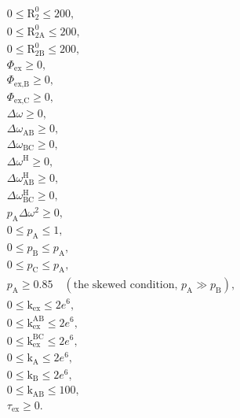 \documentclass[a4paper,11pt,twoside,openright]{book}
\def\lthtmlcheckvsize{\ifdim\ht\sizebox<\vsize 
  \ifdim\wd\sizebox<\hsize\expandafter\hfill\fi \expandafter\vfill
  \else\expandafter\vss\fi}%
\begin{document}
{\newpage\clearpage
\setcounter{equation}{96}
%
\begin{subequations}\begin{gather}
0 \leqslant \mathrm{R}_2^0\leqslant 200, \\
0 \leqslant \mathrm{R}_{\mathrm{2A}}^0\leqslant 200, \\
0 \leqslant \mathrm{R}_{\mathrm{2B}}^0\leqslant 200, \\
\Phi_{\textrm{ex}}\geqslant 0, \\
\Phi_{\textrm{ex,B}}\geqslant 0, \\
\Phi_{\textrm{ex,C}}\geqslant 0, \\
\Delta\omega \geqslant 0, \\
\Delta\omega_{\textrm{AB}}\geqslant 0, \\
\Delta\omega_{\textrm{BC}}\geqslant 0, \\
\Delta\omega^{\scriptscriptstyle\mathrm{H}}\geqslant 0, \\
\Delta\omega^{\scriptscriptstyle\mathrm{H}}_{\textrm{AB}}\geqslant 0, \\
\Delta\omega^{\scriptscriptstyle\mathrm{H}}_{\textrm{BC}}\geqslant 0, \\
p_{\textrm{A}}\Delta\omega ^2 \geqslant 0, \\
0 \leqslant p_{\textrm{A}}\leqslant 1, \\
0 \leqslant p_{\textrm{B}}\leqslant p_{\textrm{A}}, \\
0 \leqslant p_{\textrm{C}}\leqslant p_{\textrm{A}}, \\
p_{\textrm{A}}\geqslant 0.85 \quad (\textrm{the skewed condition, } p_{\textrm{A}}\gg p_{\textrm{B}}), \\
0 \leqslant \textrm{k}_{\textrm{ex}}\leqslant 2e^6, \\
0 \leqslant \textrm{k}_{\textrm{ex}}^{\textrm{AB}}\leqslant 2e^6, \\
0 \leqslant \textrm{k}_{\textrm{ex}}^{\textrm{BC}}\leqslant 2e^6, \\
0 \leqslant \textrm{k}_{\textrm{A}}\leqslant 2e^6, \\
0 \leqslant \textrm{k}_{\textrm{B}}\leqslant 2e^6, \\
0 \leqslant \textrm{k}_{\textrm{AB}}\leqslant 100, \\
\tau_{\textrm{ex}}\geqslant 0.
\end{gather}\end{subequations}%
\lthtmldisplayZ
\lthtmlcheckvsize\clearpage}
\end{document}
